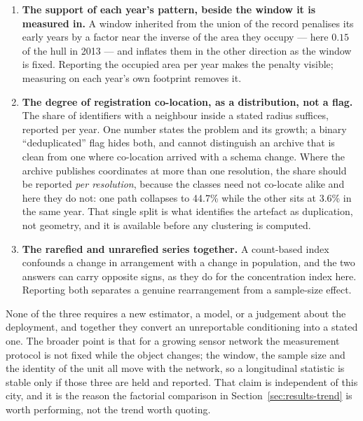 \documentclass{article}
\begin{document}
\begin{enumerate}
\item \textbf{The support of each year's pattern, beside the window it is measured in.} A window
inherited from the union of the record penalises its early years by a factor near the inverse of
the area they occupy --- here $0.15$ of the hull in 2013 --- and inflates them in the other
direction as the window is fixed. Reporting the occupied area per year makes the penalty visible;
measuring on each year's own footprint removes it.
\item \textbf{The degree of registration co-location, as a distribution, not a flag.} The
share of identifiers with a neighbour inside a stated radius suffices, reported per year. One
number states the problem and its growth; a binary ``deduplicated'' flag hides both, and cannot
distinguish an archive that is clean from one where co-location arrived with a schema change.
Where the archive publishes coordinates at more than one resolution, the share should be reported
\emph{per resolution}, because the classes need not co-locate alike and here they do not: one path
collapses to \num{44.7}\% while the other sits at \num{3.6}\% in the same year. That single
split is what identifies the artefact as duplication, not geometry, and it is available
before any clustering is computed.
\item \textbf{The rarefied and unrarefied series together.} A count-based index confounds a
change in arrangement with a change in population, and the two answers can carry opposite signs,
as they do for the concentration index here. Reporting both separates a genuine rearrangement
from a sample-size effect.
\end{enumerate}

None of the three requires a new estimator, a model, or a judgement about the deployment, and
together they convert an unreportable conditioning into a stated one. The broader point is that
for a growing sensor network the measurement protocol is not fixed while the object changes; the
window, the sample size and the identity of the unit all move with the network, so a longitudinal
statistic is stable only if those three are held and reported. That claim is independent of this
city, and it is the reason the factorial comparison in Section~\ref{sec:results-trend} is worth
performing, not the trend worth quoting.
\end{document}
